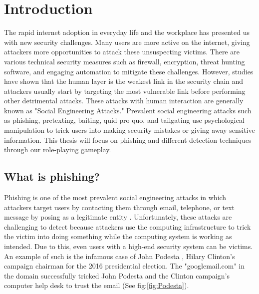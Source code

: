 

\pagestyle{plain} %
\setcounter{page}{1}


\chapter{Introduction}
The rapid internet adoption in everyday life and the workplace has presented us with new security challenges. Many users are more active on the internet, giving attackers more opportunities to attack these unsuspecting victims. There are various technical security measures such as firewall, encryption, threat hunting software, and engaging automation to mitigate these challenges. However, studies have shown that the human layer is the weakest link in the security chain \cite{jampen} and attackers usually start by targeting the most vulnerable link before performing other detrimental attacks. These attacks with human interaction are generally known as "Social Engineering Attacks." Prevalent social engineering attacks such as phishing, pretexting, baiting, quid pro quo, and tailgating use psychological manipulation to trick users into making security mistakes or giving away sensitive information. This thesis will focus on phishing and different detection techniques through our role-playing gameplay.

\section{What is phishing?}
Phishing is one of the most prevalent social engineering attacks in which attackers target users by contacting them through email, telephone, or text message by posing as a legitimate entity \cite{phishing, apwg}. Unfortunately, these attacks are challenging to detect because attackers use the computing infrastructure to trick the victim into doing something while the computing system is working as intended. Due to this, even users with a high-end security system can be victims. An example of such is the infamous case of John Podesta \cite{Podesta}, Hilary Clinton's campaign chairman for the 2016 presidential election. The "googlemail.com" in the domain successfully tricked John Podesta and the Clinton campaign's computer help desk to trust the email (See fig:\ref{fig:Podesta}).

